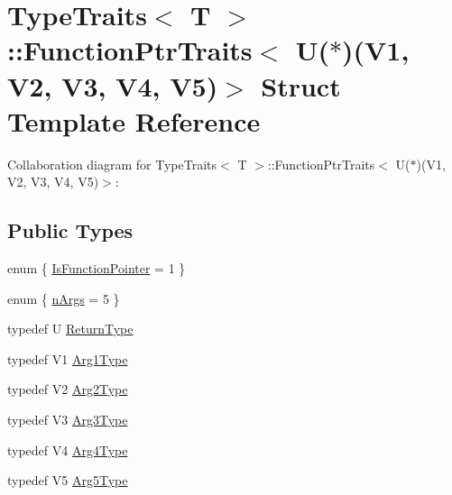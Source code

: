 \hypertarget{structTypeTraits_1_1FunctionPtrTraits_3_01U_07_5_08_07V1_00_01V2_00_01V3_00_01V4_00_01V5_08_4}{}\section{Type\+Traits$<$ T $>$\+:\+:Function\+Ptr\+Traits$<$ U($\ast$)(V1, V2, V3, V4, V5)$>$ Struct Template Reference}
\label{structTypeTraits_1_1FunctionPtrTraits_3_01U_07_5_08_07V1_00_01V2_00_01V3_00_01V4_00_01V5_08_4}


Collaboration diagram for Type\+Traits$<$ T $>$\+:\+:Function\+Ptr\+Traits$<$ U($\ast$)(V1, V2, V3, V4, V5)$>$\+:
\subsection*{Public Types}
\begin{DoxyCompactItemize}
\item 
enum \{ \hyperlink{structTypeTraits_1_1FunctionPtrTraits_3_01U_07_5_08_07V1_00_01V2_00_01V3_00_01V4_00_01V5_08_4_a966acf97f4790d99be17ba2c0a1df4dca5239b2c1cac57f8a7aec93117fcd2192}{Is\+Function\+Pointer} = 1
 \}
\item 
enum \{ \hyperlink{structTypeTraits_1_1FunctionPtrTraits_3_01U_07_5_08_07V1_00_01V2_00_01V3_00_01V4_00_01V5_08_4_a0cc870669b2dadf02605158758cfdb8ca04c27fa723268137f2689568997c238f}{n\+Args} = 5
 \}
\item 
typedef U \hyperlink{structTypeTraits_1_1FunctionPtrTraits_3_01U_07_5_08_07V1_00_01V2_00_01V3_00_01V4_00_01V5_08_4_abd8e460bfb3552591173e46421474d21}{Return\+Type}
\item 
typedef V1 \hyperlink{structTypeTraits_1_1FunctionPtrTraits_3_01U_07_5_08_07V1_00_01V2_00_01V3_00_01V4_00_01V5_08_4_a8b94d48c925017504a420e57398ce5bc}{Arg1\+Type}
\item 
typedef V2 \hyperlink{structTypeTraits_1_1FunctionPtrTraits_3_01U_07_5_08_07V1_00_01V2_00_01V3_00_01V4_00_01V5_08_4_a580ca604714e02c1e2eabe15f553ef8e}{Arg2\+Type}
\item 
typedef V3 \hyperlink{structTypeTraits_1_1FunctionPtrTraits_3_01U_07_5_08_07V1_00_01V2_00_01V3_00_01V4_00_01V5_08_4_a74cb9f2aa12c24763b4e69f25bcd136c}{Arg3\+Type}
\item 
typedef V4 \hyperlink{structTypeTraits_1_1FunctionPtrTraits_3_01U_07_5_08_07V1_00_01V2_00_01V3_00_01V4_00_01V5_08_4_a8e5182de8adeb51001eeee10d5224a6f}{Arg4\+Type}
\item 
typedef V5 \hyperlink{structTypeTraits_1_1FunctionPtrTraits_3_01U_07_5_08_07V1_00_01V2_00_01V3_00_01V4_00_01V5_08_4_a22781a60395a87f5cb322d6271f8df2f}{Arg5\+Type}
\end{DoxyCompactItemize}


